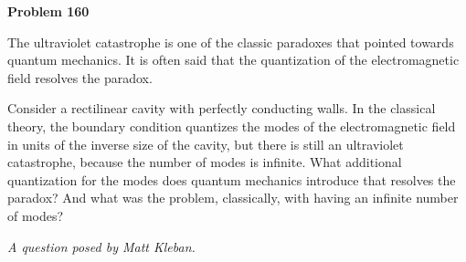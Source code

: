 \documentclass[12pt]{article}
\begin{document}
\begin{pottproblem}
\textbf{Problem 160}

The ultraviolet catastrophe is one of the classic paradoxes that
pointed towards quantum mechanics.  It is often said that the
quantization of the electromagnetic field resolves the paradox.

Consider a rectilinear cavity with perfectly conducting walls.  In the
classical theory, the boundary condition quantizes the modes of the
electromagnetic field in units of the inverse size of the cavity, but
there is still an ultraviolet catastrophe, because the number of modes
is infinite. What additional quantization for the modes does quantum
mechanics introduce that resolves the paradox? And what was the problem,
classically, with having an infinite number of modes?

{\normalsize\emph{A question posed by Matt Kleban.}}
\end{pottproblem}
\end{document}
